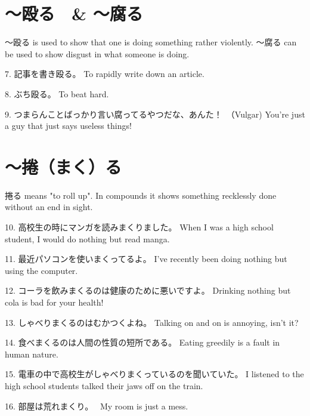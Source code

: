 \section{～殴る　\& ～腐る}
 
\par{ ～殴る is used to show that one is doing something rather violently. ～腐る can be used to show disgust in what someone is doing. }

\par{7. 記事を書き殴る。 \hfill\break
To rapidly write down an article. }

\par{8. ぶち殴る。 \hfill\break
To beat hard. }

\par{9. つまらんことばっかり言い腐ってるやつだな、あんた！　（Vulgar) \hfill\break
You're just a guy that just says useless things! }
      
\section{～捲（まく）る}
 
\par{ 捲る means "to roll up". In compounds it shows something recklessly done without an end in sight. }

\par{10. 高校生の時にマンガを読みまくりました。 \hfill\break
When I was a high school student, I would do nothing but read manga. }

\par{11. 最近パソコンを使いまくってるよ。 \hfill\break
I've recently been doing nothing but using the computer. }

\par{12. コーラを飲みまくるのは健康のために悪いですよ。 \hfill\break
Drinking nothing but cola is bad for your health! }

\par{13. しゃべりまくるのはむかつくよね。 \hfill\break
Talking on and on is annoying, isn't it? }

\par{14. 食べまくるのは人間の性質の短所である。 \hfill\break
Eating greedily is a fault in human nature. }

\par{15. 電車の中で高校生がしゃべりまくっているのを聞いていた。 \hfill\break
I listened to the high school students talked their jaws off on the train. }

\par{16. 部屋は荒れまくり。 \hfill\break
~My room is just a mess. }
      

